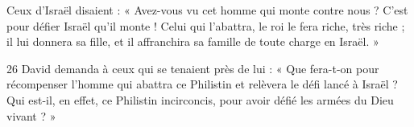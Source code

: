 Ceux d’Israël disaient : « Avez-vous vu cet homme qui monte contre nous ? C’est pour défier Israël qu’il monte ! Celui qui l’abattra, le roi le fera riche, très riche ; il lui donnera sa fille, et il affranchira sa famille de toute charge en Israël. »

26 David demanda à ceux qui se tenaient près de lui : « Que fera-t-on pour récompenser l’homme qui abattra ce Philistin et relèvera le défi lancé à Israël ? Qui est-il, en effet, ce Philistin incirconcis, pour avoir défié les armées du Dieu vivant ? »
